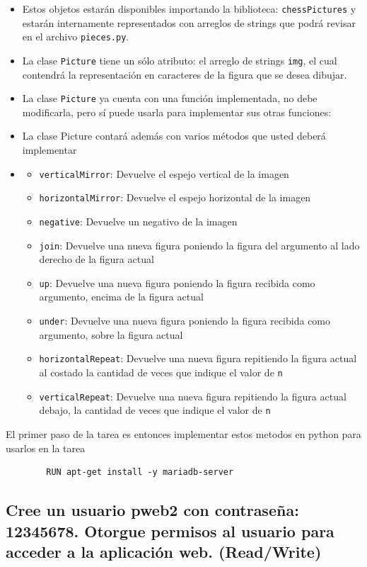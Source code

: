 \begin{itemize}
    \item Estos objetos estarán disponibles importando la biblioteca: \texttt{chessPictures} y estarán internamente representados con arreglos de strings que podrá revisar en el archivo \texttt{pieces.py}.
    \item La clase \texttt{Picture} tiene un sólo atributo: el arreglo de strings \texttt{img}, el cual contendrá la representación en caracteres de la figura que se desea dibujar.
    \item La clase \texttt{Picture} ya cuenta con una función implementada, no debe modificarla, pero sí puede usarla para implementar sus otras funciones:
    \item La clase Picture contará además con varios métodos que usted deberá implementar
    \item \begin{itemize}
		\item \texttt{verticalMirror}: Devuelve el espejo vertical de la imagen
		\item \texttt{horizontalMirror}: Devuelve el espejo horizontal de la imagen
		\item \texttt{negative}: Devuelve un negativo de la imagen
		\item \texttt{join}: Devuelve una nueva figura poniendo la figura del argumento al lado derecho de la figura actual
		\item \texttt{up}: Devuelve una nueva figura poniendo la figura recibida como argumento, encima de la figura actual
		\item \texttt{under}: Devuelve una nueva figura poniendo la figura recibida como argumento, sobre la figura actual
		\item \texttt{horizontalRepeat}: Devuelve una nueva figura repitiendo la figura actual al costado la cantidad de veces que indique el valor de \texttt{n}
		\item \texttt{verticalRepeat}: Devuelve una nueva figura repitiendo la figura actual debajo, la cantidad de veces que indique el valor de \texttt{n}
	\end{itemize}	
\end{itemize}

	El primer paso de la tarea es entonces implementar estos metodos en python para usarlos en la tarea
	\begin{lstlisting}
		RUN apt-get install -y mariadb-server
	\end{lstlisting}

	\subsection{Cree un usuario pweb2 con contraseña: 12345678. \newline
	Otorgue permisos al usuario para acceder a la aplicación web. (Read/Write) \newline}

